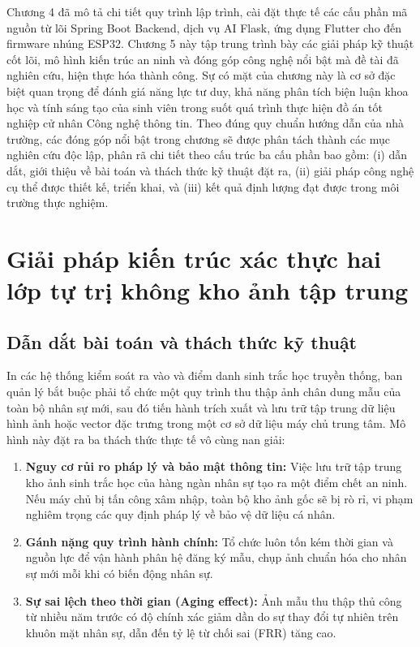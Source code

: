﻿\documentclass[../DoAn.tex]{subfiles}
\begin{document}
Chương 4 đã mô tả chi tiết quy trình lập trình, cài đặt thực tế các cấu phần mã nguồn từ lõi Spring Boot Backend, dịch vụ AI Flask, ứng dụng Flutter cho đến firmware nhúng ESP32. Chương 5 này tập trung trình bày các giải pháp kỹ thuật cốt lõi, mô hình kiến trúc an ninh và đóng góp công nghệ nổi bật mà đề tài đã nghiên cứu, hiện thực hóa thành công. Sự có mặt của chương này là cơ sở đặc biệt quan trọng để đánh giá năng lực tư duy, khả năng phân tích biện luận khoa học và tính sáng tạo của sinh viên trong suốt quá trình thực hiện đồ án tốt nghiệp cử nhân Công nghệ thông tin. Theo đúng quy chuẩn hướng dẫn của nhà trường, các đóng góp nổi bật trong chương sẽ được phân tách thành các mục nghiên cứu độc lập, phân rã chi tiết theo cấu trúc ba cấu phần bao gồm: (i) dẫn dắt, giới thiệu về bài toán và thách thức kỹ thuật đặt ra, (ii) giải pháp công nghệ cụ thể được thiết kế, triển khai, và (iii) kết quả định lượng đạt được trong môi trường thực nghiệm.

\section{Giải pháp kiến trúc xác thực hai lớp tự trị không kho ảnh tập trung}
\label{section:5.1}

\subsection{Dẫn dắt bài toán và thách thức kỹ thuật}

In các hệ thống kiểm soát ra vào và điểm danh sinh trắc học truyền thống, ban quản lý bắt buộc phải tổ chức một quy trình thu thập ảnh chân dung mẫu của toàn bộ nhân sự mới, sau đó tiến hành trích xuất và lưu trữ tập trung dữ liệu hình ảnh hoặc vector đặc trưng trong một cơ sở dữ liệu máy chủ trung tâm. Mô hình này đặt ra ba thách thức thực tế vô cùng nan giải:
\begin{enumerate}
    \item \textbf{Nguy cơ rủi ro pháp lý và bảo mật thông tin:} Việc lưu trữ tập trung kho ảnh sinh trắc học của hàng ngàn nhân sự tạo ra một điểm chết an ninh. Nếu máy chủ bị tấn công xâm nhập, toàn bộ kho ảnh gốc sẽ bị rò rỉ, vi phạm nghiêm trọng các quy định pháp lý về bảo vệ dữ liệu cá nhân.
    \item \textbf{Gánh nặng quy trình hành chính:} Tổ chức luôn tốn kém thời gian và nguồn lực để vận hành phân hệ đăng ký mẫu, chụp ảnh chuẩn hóa cho nhân sự mới mỗi khi có biến động nhân sự.
    \item \textbf{Sự sai lệch theo thời gian (Aging effect):} Ảnh mẫu thu thập thủ công từ nhiều năm trước có độ chính xác giảm dần do sự thay đổi tự nhiên trên khuôn mặt nhân sự, dẫn đến tỷ lệ từ chối sai (FRR) tăng cao.
\end{enumerate}
\end{document}

